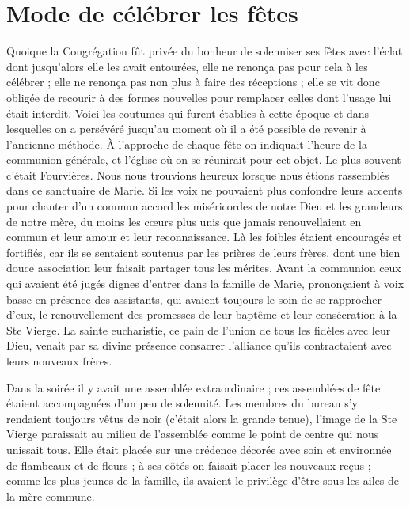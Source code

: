 \section*{Mode de célébrer les fêtes}
Quoique la Congrégation fût privée du bonheur de solenniser
ses fêtes avec l'éclat dont jusqu'alors elle les avait entourées, elle ne renonça pas pour cela à les célébrer ; elle ne renonça pas non plus à faire des réceptions ; elle se vit donc obligée de recourir à des formes nouvelles pour remplacer celles dont l'usage lui était interdit. Voici les coutumes qui furent établies à cette époque et dans lesquelles on a persévéré jusqu'au moment où il a été possible de revenir à l'ancienne méthode. À l'approche de chaque fête on indiquait l'heure de la communion générale, et l'église où on se réunirait pour cet objet. Le plus souvent c'était Fourvières. Nous nous trouvions heureux lorsque nous étions rassemblés dans ce sanctuaire de Marie. Si les voix ne pouvaient plus confondre leurs accents pour chanter d'un commun accord les miséricordes de notre Dieu et les grandeurs de notre mère, du moins les cœurs plus unis que jamais renouvellaient en commun et leur amour et leur reconnaissance. Là les foibles étaient encouragés et fortifiés, car ils se sentaient soutenus par les prières de leurs frères, dont une bien douce association leur faisait partager tous les mérites. Avant la communion ceux qui avaient été jugés dignes d'entrer dans la famille de Marie, prononçaient à voix basse en présence des assistants, qui avaient toujours le soin de se rapprocher d'eux, le renouvellement des promesses de leur baptême et leur consécration à la Ste Vierge. La sainte eucharistie, ce pain de l'union de tous les fidèles avec leur Dieu, venait par sa divine présence consacrer l'alliance qu'ils contractaient avec leurs nouveaux frères.

Dans la soirée il y avait une assemblée extraordinaire ; ces assemblées de fête étaient accompagnées d'un peu de solennité. Les membres du bureau s'y rendaient toujours vêtus de noir (c'était alors la grande tenue), l'image de la Ste Vierge paraissait au milieu de l'assemblée comme le point de centre qui nous unissait tous. Elle était placée
sur une crédence décorée avec soin et environnée de flambeaux et de fleurs ; à ses côtés on faisait placer les nouveaux reçus ; comme les plus jeunes de la famille, ils avaient le privilège d'être sous les ailes de la mère commune.


